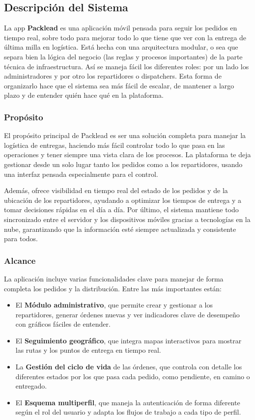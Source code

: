 \subsection{Descripción del Sistema}
La app \textbf{Packlead} es una aplicación móvil pensada para seguir los pedidos en tiempo real, sobre todo para mejorar todo lo que tiene que ver con la entrega de última milla en logística.
Está hecha con una arquitectura modular, o sea que separa bien la lógica del negocio (las reglas y procesos importantes) de la parte técnica de infraestructura. Así se maneja fácil los diferentes roles: por un lado los administradores y por otro los repartidores o dispatchers. Esta forma de organizarlo hace que el sistema sea más fácil de escalar, de mantener a largo plazo y de entender quién hace qué en la plataforma.

\subsubsection{Propósito}
El propósito principal de Packlead es ser una solución completa para manejar la logística de entregas, haciendo más fácil controlar todo lo que pasa en las operaciones y tener siempre una vista clara de los procesos. La plataforma te deja gestionar desde un solo lugar tanto los pedidos como a los repartidores, usando una interfaz pensada especialmente para el control.

Además, ofrece visibilidad en tiempo real del estado de los pedidos y de la ubicación de los repartidores, ayudando a optimizar los tiempos de entrega y a tomar decisiones rápidas en el día a día. Por último, el sistema mantiene todo sincronizado entre el servidor y los dispositivos móviles gracias a tecnologías en la nube, garantizando que la información esté siempre actualizada y consistente para todos.

\subsubsection{Alcance}
La aplicación incluye varias funcionalidades clave para manejar de forma completa los pedidos y la distribución. Entre las más importantes están:

\begin{itemize}
    \item El \textbf{Módulo administrativo}, que permite crear y gestionar a los repartidores, generar órdenes nuevas y ver indicadores clave de desempeño con gráficos fáciles de entender.
    \item El \textbf{Seguimiento geográfico}, que integra mapas interactivos para mostrar las rutas y los puntos de entrega en tiempo real.
    \item La \textbf{Gestión del ciclo de vida} de las órdenes, que controla con detalle los diferentes estados por los que pasa cada pedido, como pendiente, en camino o entregado.
    \item El \textbf{Esquema multiperfil}, que maneja la autenticación de forma diferente según el rol del usuario y adapta los flujos de trabajo a cada tipo de perfil.
\end{itemize}

